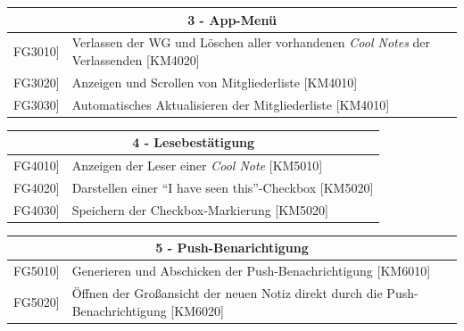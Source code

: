 \documentclass[a4paper]{scrreprt}
\begin{document}
    		\vspace{5mm}
    		
    		\begin{table}[h!]
    			\centering
    			\label{my-label}
    			\begin{tabular}{p{2cm}p{12cm}}
    				
    				\multicolumn{2}{c}{\textbf{3 - App-Menü}} \\ \hline
    				\centering{[}FG3010{]} & Verlassen der WG und Löschen aller vorhandenen \textit{Cool Notes} der Verlassenden {[}KM4020{]}\\
    				\centering{[}FG3020{]} & Anzeigen und Scrollen von Mitgliederliste {[}KM4010{]}\\
    				\centering{[}FG3030{]} & Automatisches Aktualisieren der Mitgliederliste {[}KM4010{]}\\
    				\hline
    			\end{tabular}
    		\end{table}
    		
    		\vspace{5mm}
    		
    		\begin{table}[h!]
    			\centering
    			\label{my-label}
    			\begin{tabular}{p{2cm}p{12cm}}
    				
    				\multicolumn{2}{c}{\textbf{4 - Lesebestätigung}} \\ \hline
    				\centering{[}FG4010{]} & Anzeigen der Leser einer \textit{Cool Note} {[}KM5010{]}\\
    				\centering{[}FG4020{]}& Darstellen einer ``I have seen this”-Checkbox {[}KM5020{]}                              \\
    				\centering{[}FG4030{]}& Speichern der Checkbox-Markierung {[}KM5020{]}\\ 
    				
    				\hline
    			\end{tabular}
    		\end{table}
    		
    		\vspace{5mm}
    		
    		\begin{table}[h!]
    			\centering
    			\label{my-label}
    			\begin{tabular}{p{2cm}p{12cm}}
    				
    				\multicolumn{2}{c}{\textbf{5 - Push-Benarichtigung}}\\ \hline
    				\centering{[}FG5010{]} & Generieren und Abschicken der Push-Benachrichtigung {[}KM6010{]}\\
    				\centering{[}FG5020{]}&Öffnen der Großansicht der neuen Notiz direkt durch die Push-Benachrichtigung {[}KM6020{]}           \\ 
    				
    				\hline
    			\end{tabular}
    		\end{table}
    		
\end{document}

